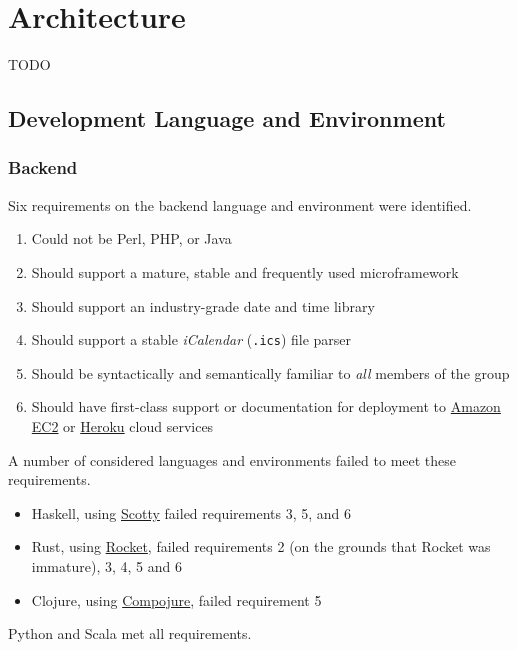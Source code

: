 \documentclass[11pt,a4paper]{report}
\begin{document}
\chapter{Architecture}

TODO
\section{Development Language and Environment}

\subsection{Backend}

Six requirements on the backend language and environment were identified.

\begin{enumerate}
    \item Could not be Perl, PHP, or Java
    \item Should support a mature, stable and frequently used microframework
    \item Should support an industry-grade date and time library
    \item Should support a stable \textit{iCalendar} (\texttt{.ics}) file parser
    \item Should be syntactically and semantically familiar to \textit{all} members of the group
    \item Should have first-class support or documentation for deployment to \href{http://docs.aws.amazon.com/AWSEC2/latest/UserGuide/concepts.html}{Amazon EC2} or \href{https://www.heroku.com/}{Heroku} cloud services
 \end{enumerate}

A number of considered languages and environments failed to meet these requirements.

\begin{itemize}
    \item Haskell, using \href{https://github.com/scotty-web/scotty}{Scotty} failed requirements 3, 5, and 6
    \item Rust, using \href{https://rocket.rs/overview/}{Rocket}, failed requirements 2 (on the grounds that Rocket was immature), 3, 4, 5 and 6
    \item Clojure, using \href{https://github.com/weavejester/compojure}{Compojure}, failed requirement 5
\end{itemize}

Python and Scala met all requirements. 
\end{document}
